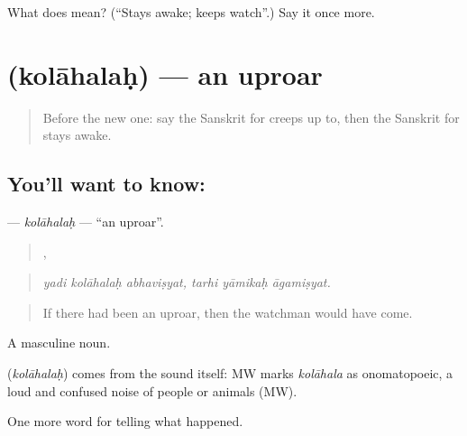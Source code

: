 \begin{tcolorbox}[breakable,colback=teal!4,colframe=teal!35!black,title={Before you move on}]
What does  mean? (\textquotedblleft{}Stays awake; keeps watch\textquotedblright{}.) Say it once more.
\end{tcolorbox}
\section[\texorpdfstring{\sk{कोलाहलः} (kolāhalaḥ)}{कोलाहलः (kolāhalaḥ)}]{ (kolāhalaḥ) — an uproar}

\label{lesson:SA-C287-kolahalah}



\begin{quote}
Before the new one: say the Sanskrit for creeps up to, then the Sanskrit for stays awake.
\end{quote}

\subsection*{You'll want to know: }
\textbf{} — \emph{kolāhalaḥ} — \textquotedblleft{}an uproar\textquotedblright{}.

\begin{quote}
  ,   
\end{quote}

\begin{quote}
\emph{yadi kolāhalaḥ abhaviṣyat, tarhi yāmikaḥ āgamiṣyat.}
\end{quote}

\begin{quote}
If there had been an uproar, then the watchman would have come.
\end{quote}

A masculine noun.

\begin{cousinweb}
\textbf{} (\emph{kolāhalaḥ}) comes from the sound itself: MW marks \emph{kolāhala} as onomatopoeic, a loud and confused noise of people or animals (MW).
\end{cousinweb}

\begin{grammarlens}[title={What you've built}]
One more word for telling what happened.
\end{grammarlens}


